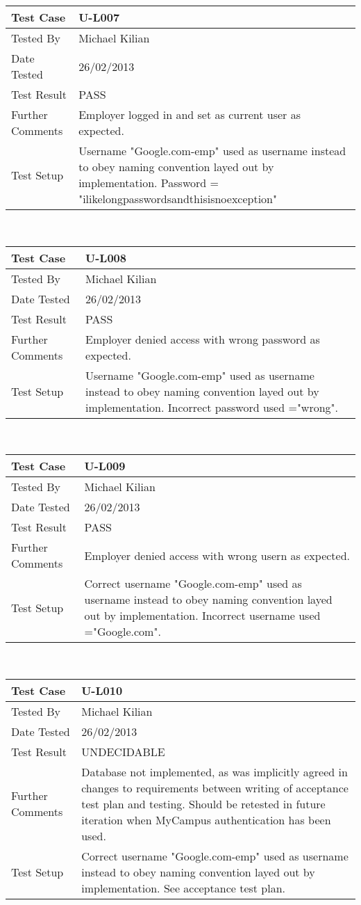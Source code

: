 \documentclass{l3deliverable}
\begin{document}
\begin{tabular}{lp{10cm}}
\hline 
\textbf{Test Case} & U-L007\tabularnewline
\hline 
\hline 
Tested By & Michael Kilian\tabularnewline
\hline 
Date Tested & 26/02/2013\tabularnewline
\hline 
Test Result & PASS\tabularnewline
\hline
Further Comments &  Employer logged in and set as current user as expected. \tabularnewline
\hline
Test Setup & Username "Google.com-emp" used as username instead to obey naming convention layed out by implementation. Password = "ilikelongpasswordsandthisisnoexception" \tabularnewline
\hline
\end{tabular}\\

\begin{tabular}{lp{10cm}}
\hline 
\textbf{Test Case} & U-L008\tabularnewline
\hline 
\hline 
Tested By & Michael Kilian\tabularnewline
\hline 
Date Tested & 26/02/2013\tabularnewline
\hline 
Test Result & PASS\tabularnewline
\hline
Further Comments &  Employer denied access with wrong password as expected. \tabularnewline
\hline
Test Setup & Username "Google.com-emp" used as username instead to obey naming convention layed out by implementation. Incorrect password used ="wrong". \tabularnewline
\hline
\end{tabular}\\

\begin{tabular}{lp{10cm}}
\hline 
\textbf{Test Case} & U-L009\tabularnewline
\hline 
\hline 
Tested By & Michael Kilian\tabularnewline
\hline 
Date Tested & 26/02/2013\tabularnewline
\hline 
Test Result & PASS\tabularnewline
\hline
Further Comments &  Employer denied access with wrong usern as expected. \tabularnewline
\hline
Test Setup & Correct username "Google.com-emp" used as username instead to obey naming convention layed out by implementation. Incorrect username used ="Google.com". \tabularnewline
\hline
\end{tabular}\\

\begin{tabular}{lp{10cm}}
\hline 
\textbf{Test Case} & U-L010\tabularnewline
\hline 
\hline 
Tested By & Michael Kilian\tabularnewline
\hline 
Date Tested & 26/02/2013\tabularnewline
\hline 
Test Result & UNDECIDABLE\tabularnewline
\hline
Further Comments &   Database not implemented, as was implicitly agreed in changes to requirements between writing of acceptance test plan and testing. Should be retested in future iteration when MyCampus authentication has been used. \tabularnewline
\hline
Test Setup & Correct username "Google.com-emp" used as username instead to obey naming convention layed out by implementation. See acceptance test plan. \tabularnewline
\hline
\end{tabular}\\
\end{document}
